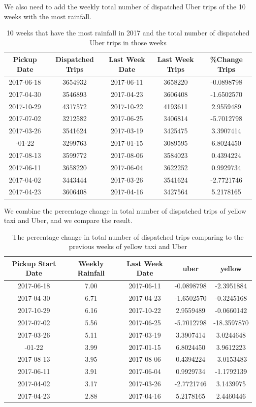 \documentclass[12pt,twoside]{reedthesis}
\theoremstyle{definition}
\theoremstyle{definition}
\theoremstyle{definition}
\theoremstyle{remark}
\begin{document}
We also need to add the weekly total number of dispatched Uber trips of
the 10 weeks with the most rainfall.
\begin{table}

\caption{\label{tab:unnamed-chunk-77}10 weeks that have the most rainfall in 2017 and the total number of dispatched Uber trips in those weeks}
\centering
\begin{tabular}[t]{ccccc}
\toprule
Pickup Date & Dispatched Trips & Last Week Date & Last Week Trips & \%Change Trips\\
\midrule
2017-06-18 & 3654932 & 2017-06-11 & 3658220 & -0.0898798\\
2017-04-30 & 3546893 & 2017-04-23 & 3606408 & -1.6502570\\
2017-10-29 & 4317572 & 2017-10-22 & 4193611 & 2.9559489\\
2017-07-02 & 3212582 & 2017-06-25 & 3406814 & -5.7012798\\
2017-03-26 & 3541624 & 2017-03-19 & 3425475 & 3.3907414\\
\addlinespace
2017-01-22 & 3299763 & 2017-01-15 & 3089595 & 6.8024450\\
2017-08-13 & 3599772 & 2017-08-06 & 3584023 & 0.4394224\\
2017-06-11 & 3658220 & 2017-06-04 & 3622252 & 0.9929734\\
2017-04-02 & 3443444 & 2017-03-26 & 3541624 & -2.7721746\\
2017-04-23 & 3606408 & 2017-04-16 & 3427564 & 5.2178165\\
\bottomrule
\end{tabular}
\end{table}
We combine the percentage change in total number of dispatched trips of
yellow taxi and Uber, and we compare the result.
\begin{table}

\caption{\label{tab:unnamed-chunk-79}The percentage change in total number of dispatched trips comparing to the previous weeks of yellow taxi and Uber}
\centering
\begin{tabular}[t]{ccccc}
\toprule
Pickup Start Date & Weekly Rainfall & Last Week Date & uber & yellow\\
\midrule
2017-06-18 & 7.00 & 2017-06-11 & -0.0898798 & -2.3951884\\
2017-04-30 & 6.71 & 2017-04-23 & -1.6502570 & -0.3245168\\
2017-10-29 & 6.16 & 2017-10-22 & 2.9559489 & -0.0660142\\
2017-07-02 & 5.56 & 2017-06-25 & -5.7012798 & -18.3597870\\
2017-03-26 & 5.11 & 2017-03-19 & 3.3907414 & 3.0244648\\
\addlinespace
2017-01-22 & 3.99 & 2017-01-15 & 6.8024450 & 3.9612223\\
2017-08-13 & 3.95 & 2017-08-06 & 0.4394224 & -3.0153483\\
2017-06-11 & 3.91 & 2017-06-04 & 0.9929734 & -1.1792139\\
2017-04-02 & 3.17 & 2017-03-26 & -2.7721746 & 3.1439975\\
2017-04-23 & 2.88 & 2017-04-16 & 5.2178165 & 2.4460446\\
\bottomrule
\end{tabular}
\end{table}
\end{document}
